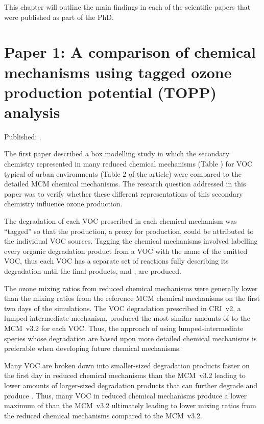 This chapter will outline the main findings in each of the scientific papers that were published as part of the PhD.

\section{Paper 1: A comparison of chemical mechanisms using tagged ozone production potential (TOPP) analysis} \label{s:chemical_mechanism_results}

Published: .
\vspace{5mm}

The first paper described a box modelling study in which the secondary chemistry represented in many reduced chemical mechanisms (Table ) for VOC typical of urban environments (Table 2 of the article) were compared to the detailed MCM chemical mechanisms.
The research question addressed in this paper was to verify whether these different representations of this secondary chemistry influence ozone production.

The degradation of each VOC prescribed in each chemical mechanism was ``tagged'' so that the  production, a proxy for  production, could be attributed to the individual VOC sources.
Tagging the chemical mechanisms involved labelling every organic degradation product from a VOC with the name of the emitted VOC, thus each VOC has a separate set of reactions fully describing its degradation until the final products,  and , are produced.

The ozone mixing ratios from reduced chemical mechanisms were generally lower than the mixing ratios from the reference MCM chemical mechanisms on the first two days of the simulations.
The VOC degradation prescribed in CRI~v2, a lumped-intermediate mechanism, produced the most similar amounts of  to the MCM~v3.2 for each VOC.
Thus, the approach of using lumped-intermediate species whose degradation are based upon more detailed chemical mechanisms is preferable when developing future chemical mechanisms.

Many VOC are broken down into smaller-sized degradation products faster on the first day in reduced chemical mechanisms than the MCM~v3.2 leading to lower amounts of larger-sized degradation products that can further degrade and produce .
Thus, many VOC in reduced chemical mechanisms produce a lower maximum of  than the MCM~v3.2 ultimately leading to lower  mixing ratios from the reduced chemical mechanisms compared to the MCM~v3.2.

